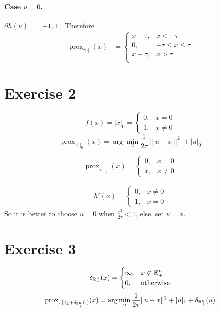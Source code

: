 \documentclass[12pt]{article}
\newcommand{\prox}{\operatorname{prox}}
\begin{document}
\paragraph{Case $u = 0$.}
$\partial h(u) = [-1, 1]$
Therefore
\begin{align*}
  \prox_{\tau |\cdot|}(x)
   & = \begin{cases}
    x - \tau, & x < -\tau              \\
    0,        & -\tau \leq x \leq \tau \\
    x + \tau, & x > \tau               \\
  \end{cases}
\end{align*}

\section{Exercise 2}

\begin{equation}
  f(x) = |x|_0 = \begin{cases}
    0, & x = 0    \\
    1, & x \neq 0
  \end{cases}
\end{equation}
\begin{equation}
  \prox_{\tau |\cdot|_0}(x) = \arg\min_{u} \frac{1}{2\tau}\|u-x\|^2 + |u|_0
\end{equation}

\begin{equation}
  \prox_{\tau |\cdot|_0}(x) = \begin{cases}
    0, & x = 0    \\
    x, & x \neq 0
  \end{cases}
\end{equation}

\begin{align*}
  h'(x) = \begin{cases}
    0, & x \neq 0 \\
    1, & x = 0
  \end{cases}
\end{align*}
So it is better to choose $u = 0$ when $\frac{x^2}{2\tau} < 1$, else, set $u = x$.

\section{Exercise 3}
\begin{equation}
  \delta_{\mathbb{R}_+^n} (x) = \begin{cases}
    \infty, & x \not \in \mathbb{R}_+^n \\
    0,      & \text{otherwise}
  \end{cases}
\end{equation}
\begin{equation}
  \prox_{\tau |\cdot|_1 + \delta_{\R_+^n} (\cdot)}(x) = \arg\min_{u} \frac{1}{2\tau}\|u-x\|^2 + |u|_1 + \delta_{\R_+^n} (u)
\end{equation}
\end{document}

